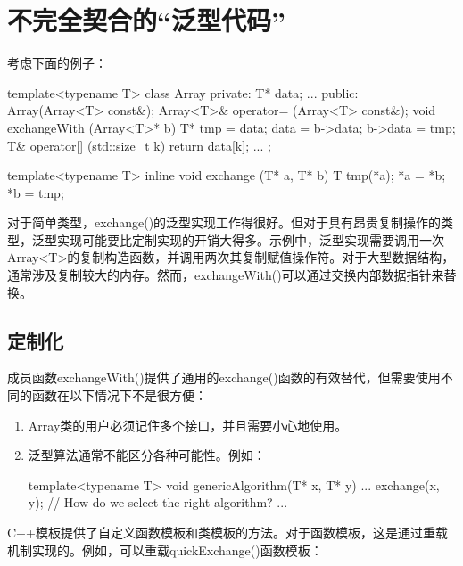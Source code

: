 \section{不完全契合的“泛型代码”}

考虑下面的例子：

\begin{cpp}
template<typename T>
class Array {
	private:
	T* data;
	...
	public:
	Array(Array<T> const&);
	Array<T>& operator= (Array<T> const&);
	void exchangeWith (Array<T>* b) {
		T* tmp = data;
		data = b->data;
		b->data = tmp;
	}
	T& operator[] (std::size_t k) {
		return data[k];
	}
	...
};

template<typename T> inline
void exchange (T* a, T* b) {
T tmp(*a);
*a = *b;
*b = tmp;
}
\end{cpp}

对于简单类型，exchange()的泛型实现工作得很好。但对于具有昂贵复制操作的类型，泛型实现可能要比定制实现的开销大得多。示例中，泛型实现需要调用一次Array<T>的复制构造函数，并调用两次其复制赋值操作符。对于大型数据结构，通常涉及复制较大的内存。然而，exchangeWith()可以通过交换内部数据指针来替换。

\subsection{定制化}

成员函数exchangeWith()提供了通用的exchange()函数的有效替代，但需要使用不同的函数在以下情况下不是很方便：

\begin{enumerate}
\item 
Array类的用户必须记住多个接口，并且需要小心地使用。

\item 
泛型算法通常不能区分各种可能性。例如：

\begin{cpp}
template<typename T>
void genericAlgorithm(T* x, T* y) {
	...
	exchange(x, y); // How do we select the right algorithm?
	...
}
\end{cpp}

\end{enumerate}

C++模板提供了自定义函数模板和类模板的方法。对于函数模板，这是通过重载机制实现的。例如，可以重载quickExchange()函数模板：


